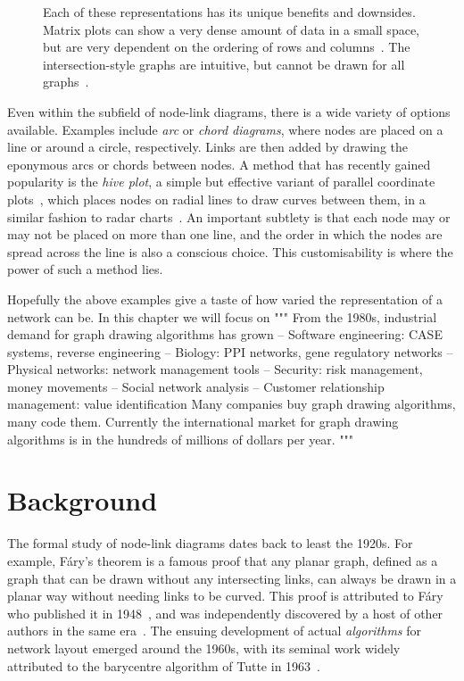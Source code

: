 \begin{figure}
\caption{Each of these representations has its unique benefits and downsides. Matrix plots can show a very dense amount of data in a small space, but are very dependent on the ordering of rows and columns~\cite{Liiv2010}.
The intersection-style graphs are intuitive, but cannot be drawn for all graphs~\cite{TODO}.}

\label{fig:graph_representations}
\end{figure}

Even within the subfield of node-link diagrams, there is a wide variety of options available.
Examples include \emph{arc} or \emph{chord diagrams}, where nodes are placed on a line or around a circle, respectively. Links are then added by drawing the eponymous arcs or chords between nodes.
A method that has recently gained popularity is the \emph{hive plot}, a simple but effective variant of parallel coordinate plots~\cite{Krzywinski2012}, which places nodes on radial lines to draw curves between them, in a similar fashion to radar charts~\cite{Porter2018}. An important subtlety is that each node may or may not be placed on more than one line, and the order in which the nodes are spread across the line is also a conscious choice. This customisability is where the power of such a method lies.

Hopefully the above examples give a taste of how varied the representation of a network can be. In this chapter we will focus on 
"""
 From the 1980s, industrial demand for graph drawing algorithms has grown
– Software engineering: CASE systems, reverse engineering – Biology: PPI networks, gene regulatory networks
– Physical networks: network management tools
– Security: risk management, money movements
– Social network analysis
– Customer relationship management: value identification Many companies buy graph drawing algorithms, many code them.
Currently the international market for graph drawing algorithms is in the hundreds of millions of dollars per year.
"""

\section{Background}
\label{sec:nodes_background}
The formal study of node-link diagrams dates back to least the 1920s. For example, F\'ary's theorem is a famous proof that any planar graph, defined as a graph that can be drawn without any intersecting links, can always be drawn in a planar way without needing links to be curved. This proof is attributed to F\'ary who published it in 1948~\cite{Fary1948}, and was independently discovered by a host of other authors in the same era~\cite{Steinitz1922, Wagner1936, Koebe1936, Stein1951}.
The ensuing development of actual \emph{algorithms} for network layout emerged around the 1960s, with its seminal work widely attributed to the barycentre algorithm of Tutte in 1963~\cite{Tutte1963}. 

